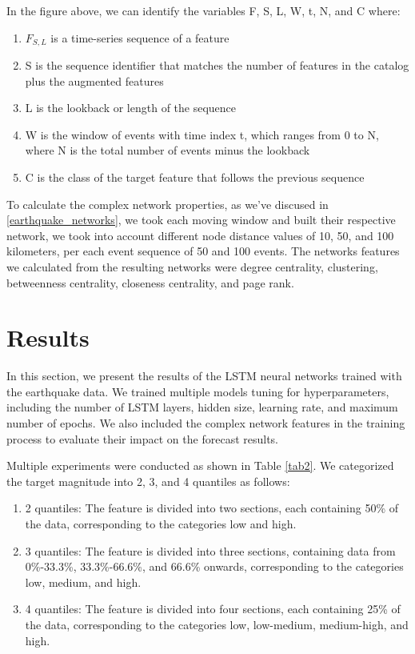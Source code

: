 \documentclass[sn-mathphys-num]{sn-jnl}
\begin{document}
In the figure above, we can identify the variables F, S, L, W, t, N, and C where:

\begin{enumerate}
    \item \( F_{S,L} \) is a time-series sequence of a feature
    \item S is the sequence identifier that matches the number of features in the catalog plus the augmented features
    \item L is the lookback or length of the sequence
    \item W is the window of events with time index t, which ranges from 0 to N, where N is the total number of events minus the lookback
    \item C is the class of the target feature that follows the previous sequence
\end{enumerate}


To calculate the complex network properties, as we've discused in \ref{earthquake_networks}, we took each moving window and built their respective network, we took into account different node distance values of 10, 50, and 100 kilometers, per each event sequence of 50 and 100 events. The networks features we calculated from the resulting networks were degree centrality, clustering, betweenness centrality, closeness centrality, and page rank.

\section{Results}\label{results}

In this section, we present the results of the LSTM neural networks trained with the earthquake data. We trained multiple models tuning for hyperparameters, including the number of LSTM layers, hidden size, learning rate, and maximum number of epochs. We also included the complex network features in the training process to evaluate their impact on the forecast results.

Multiple experiments were conducted as shown in Table \ref{tab2}. We categorized the target magnitude into 2, 3, and 4 quantiles as follows:
\begin{enumerate}
    \item 2 quantiles: The feature is divided into two sections, each containing 50\% of the data, corresponding to the categories low and high.
    \item 3 quantiles: The feature is divided into three sections, containing data from 0\%-33.3\%, 33.3\%-66.6\%, and 66.6\% onwards, corresponding to the categories low, medium, and high.
    \item 4 quantiles: The feature is divided into four sections, each containing 25\% of the data, corresponding to the categories low, low-medium, medium-high, and high.
\end{enumerate}
\end{document}
